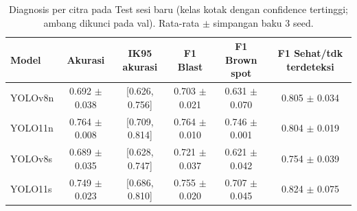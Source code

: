 \begin{table}[!t]
\centering
\caption{Diagnosis per citra pada Test sesi baru (kelas kotak dengan confidence tertinggi; ambang dikunci pada val). Rata-rata $\pm$ simpangan baku 3 seed.}
\label{tab:diagnosis_test_new_session_dengan_background}
\footnotesize
\begin{tabular}{lccccc}
\hline
\textbf{Model} & \textbf{Akurasi} & \textbf{IK95 akurasi} & \textbf{F1 Blast} & \textbf{F1 Brown spot} & \textbf{F1 Sehat/tdk terdeteksi} \\
\hline
YOLOv8n & 0.692 $\pm$ 0.038 & [0.626, 0.756] & 0.703 $\pm$ 0.021 & 0.631 $\pm$ 0.070 & 0.805 $\pm$ 0.034 \\
YOLO11n & 0.764 $\pm$ 0.008 & [0.709, 0.814] & 0.764 $\pm$ 0.010 & 0.746 $\pm$ 0.001 & 0.804 $\pm$ 0.019 \\
YOLOv8s & 0.689 $\pm$ 0.035 & [0.628, 0.747] & 0.721 $\pm$ 0.037 & 0.621 $\pm$ 0.042 & 0.754 $\pm$ 0.039 \\
YOLO11s & 0.749 $\pm$ 0.023 & [0.686, 0.810] & 0.755 $\pm$ 0.020 & 0.707 $\pm$ 0.045 & 0.824 $\pm$ 0.075 \\
\hline
\end{tabular}
\end{table}
